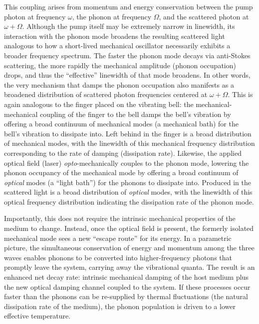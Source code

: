 This coupling arises from momentum and energy conservation between the pump photon at frequency \(\omega\), the phonon at frequency \(\Omega\), and the scattered photon at \(\omega + \Omega\). Although the pump itself may be extremely narrow in linewidth, its interaction with the phonon mode broadens the resulting scattered light analogous to how a short-lived mechanical oscillator necessarily exhibits a broader frequency spectrum. The faster the phonon mode decays via anti-Stokes scattering, the more rapidly the mechanical amplitude (phonon occupation) drops, and thus the “effective” linewidth of that mode broadens. In other words, the very mechanism that damps the phonon occupation also manifests as a broadened distribution of scattered photon frequencies centered at \(\omega + \Omega\). This is again analogous to the finger placed on the vibrating bell: the mechanical-mechanical coupling of the finger to the bell damps the bell's vibration by offering a broad continuum of mechanical modes (a mechanical bath) for the bell's vibration to dissipate into. Left behind in the finger is a broad distribution of mechanical modes, with the linewidth of this mechanical frequency distribution corresponding to the rate of damping (dissipation rate). Likewise, the applied optical field (laser) \emph{opto}-mechanically couples to the phonon mode, lowering the phonon occupancy of the mechanical mode by offering a broad continuum of \emph{optical} modes (a “light bath”) for the phonons to dissipate into. Produced in the scattered light is a broad distribution of \emph{optical} modes, with the linewidth of this optical frequency distribution indicating the dissipation rate of the phonon mode.

Importantly, this does not require the intrinsic mechanical properties of the medium to change. Instead, once the optical field is present, the formerly isolated mechanical mode sees a new “escape route” for its energy. In a parametric picture, the simultaneous conservation of energy and momentum among the three waves enables phonons to be converted into higher-frequency photons that promptly leave the system, carrying away the vibrational quanta. The result is an enhanced net decay rate: intrinsic mechanical damping of the host medium plus the new optical damping channel coupled to the system. If these processes occur faster than the phonons can be re-supplied by thermal fluctuations (the natural dissipation rate of the medium), the phonon population is driven to a lower effective temperature.

